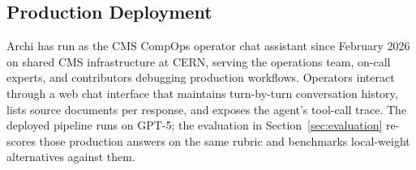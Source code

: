 \subsection{Production Deployment}
\label{sec:deployment}

Archi has run as the CMS CompOps operator chat assistant since
February 2026 on shared CMS infrastructure at CERN, serving the
operations team, on-call experts, and contributors debugging
production workflows. Operators interact through a web chat interface that
maintains turn-by-turn conversation history, lists source
documents per response, and exposes the agent's tool-call trace.
The deployed pipeline runs on GPT-5; the evaluation in
Section~\ref{sec:evaluation} re-scores those production answers
on the same rubric and benchmarks local-weight alternatives
against them.

